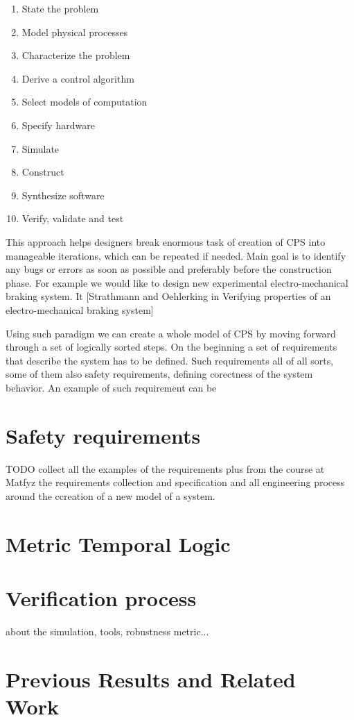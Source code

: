 \begin{enumerate}
\item State the problem
\item Model physical processes
\item Characterize the problem
\item Derive a control algorithm
\item Select models of computation
\item Specify hardware
\item Simulate
\item Construct
\item Synthesize software
\item Verify, validate and test
\end{enumerate}

This approach helps designers break enormous task of creation of CPS into manageable iterations, which can be repeated if needed. Main goal is to identify any bugs or errors as soon as possible and preferably before the construction phase. For example we would like to design new experimental electro-mechanical braking system. It [Strathmann and Oehlerking in Verifying properties of an electro-mechanical braking system]

Using such paradigm we can create a whole model of CPS by moving forward through a set of logically sorted steps. On the beginning a set of requirements that describe the system has to be defined. Such requirements all of all sorts, some of them also safety requirements, defining corectness of the system behavior. An example of such requirement can be 

\section{Safety requirements}

TODO collect all the examples of the requirements plus from the course at Matfyz the requirements collection and specification and all engineering process around the ccreation of a new model of a system.

\section{Metric Temporal Logic}

\section{Verification process}

about the simulation, tools, robustness metric...

\section{Previous Results and Related Work}
%
